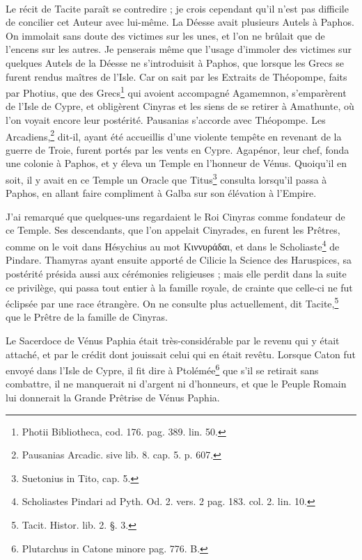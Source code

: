 \documentclass[a4paper, 18pt, oneside]{article}
\begin{document}
\paragraph{}
Le récit de Tacite paraît se contredire ; je crois cependant qu'il n'est pas difficile de concilier cet Auteur avec lui-même. La Déesse avait plusieurs Autels à Paphos. On immolait sans doute des victimes sur les unes, et l'on ne brûlait que de l'encens sur les autres. Je penserais même que l'usage d'immoler des victimes sur quelques Autels de la Déesse ne s'introduisit à Paphos, que lorsque les Grecs se furent rendus maîtres de l'Isle. Car on sait par les Extraits de Théopompe, faits par Photius, que des Grecs\footnote{Photii Bibliotheca, cod. 176. pag. 389. lin. 50.} qui avoient accompagné Agamemnon, s'emparèrent de l'Isle de Cypre, et obligèrent Cinyras et les siens de se retirer à Amathunte, où l'on voyait encore leur postérité. Pausanias s'accorde avec Théopompe. Les Arcadiens,\footnote{Pausanias Arcadic. sive lib. 8. cap. 5. p. 607.} dit-il, ayant été accueillis d'une violente tempête en revenant de la guerre de Troie, furent portés par les vents en Cypre. Agapénor, leur chef, fonda une colonie à Paphos, et y éleva un Temple en l'honneur de Vénus. Quoiqu'il en soit, il y avait en ce Temple un Oracle que Titus\footnote{Suetonius in Tito, cap. 5.} consulta lorsqu'il passa à Paphos, en allant faire compliment à Galba sur son élévation à l'Empire.

J'ai remarqué que quelques-uns regardaient le Roi Cinyras comme fondateur de ce Temple. Ses descendants, que l'on appelait Cinyrades, en furent les Prêtres, comme on le voit dans Hésychius au mot Κιννυράδαι, et dans le Scholiaste\footnote{Scholiastes Pindari ad Pyth. Od. 2. vers. 2 pag. 183. col. 2. lin. 10.} de Pindare. Thamyras ayant ensuite apporté de Cilicie la Science des Haruspices, sa postérité présida aussi aux cérémonies religieuses ; mais elle perdit dans la suite ce privilège, qui passa tout entier à la famille royale, de crainte que celle-ci ne fut éclipsée par une race étrangère. On ne consulte plus actuellement, dit Tacite,\footnote{Tacit. Histor. lib. 2. §. 3.} que le Prêtre de la famille de Cinyras.

Le Sacerdoce de Vénus Paphia était très-considérable par le revenu qui y était attaché, et par le crédit dont jouissait celui qui en était revêtu. Lorsque Caton fut envoyé dans l'Isle de Cypre, il fit dire à Ptolémée\footnote{Plutarchus in Catone minore pag. 776. B.} que s'il se retirait sans combattre, il ne manquerait ni d'argent ni d'honneurs, et que le Peuple Romain lui donnerait la Grande Prêtrise de Vénus Paphia.
\end{document}
